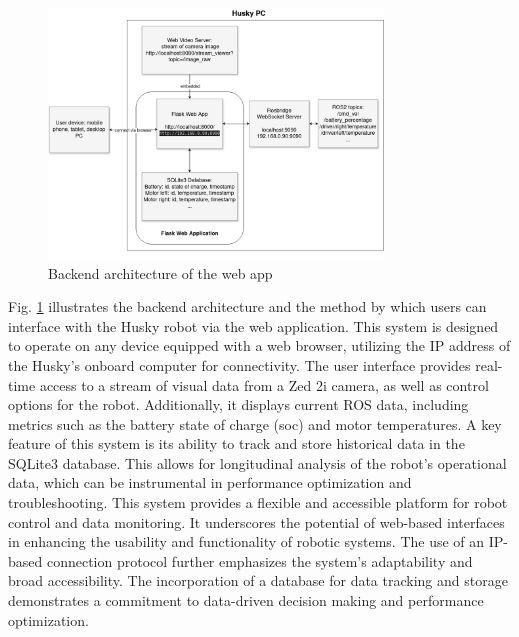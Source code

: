\documentclass[conference]{IEEEtran}
\begin{document}
\begin{figure}[htbp]
    \centerline{\includegraphics[width=8.9cm]{Pictures/userapp.png}}
    \caption{Backend architecture of the web app}
    \label{fig:userapp}
\end{figure}
Fig. \ref{fig:userapp} illustrates the backend architecture and the method by which users can interface with the Husky robot via the web application. This system is designed to operate on any device equipped with a web browser, utilizing the IP address of the Husky's onboard computer for connectivity.
The user interface provides real-time access to a stream of visual data from a Zed 2i camera, as well as control options for the robot. Additionally, it displays current ROS data, including metrics such as the battery state of charge (soc) and motor temperatures.
A key feature of this system is its ability to track and store historical data in the SQLite3 database. This allows for longitudinal analysis of the robot's operational data, which can be instrumental in performance optimization and troubleshooting.
This system provides a flexible and accessible platform for robot control and data monitoring. It underscores the potential of web-based interfaces in enhancing the usability and functionality of robotic systems. 
The use of an IP-based connection protocol further emphasizes the system's adaptability and broad accessibility. The incorporation of a database for data tracking and storage demonstrates a commitment to data-driven decision making and performance optimization. 
\end{document}
